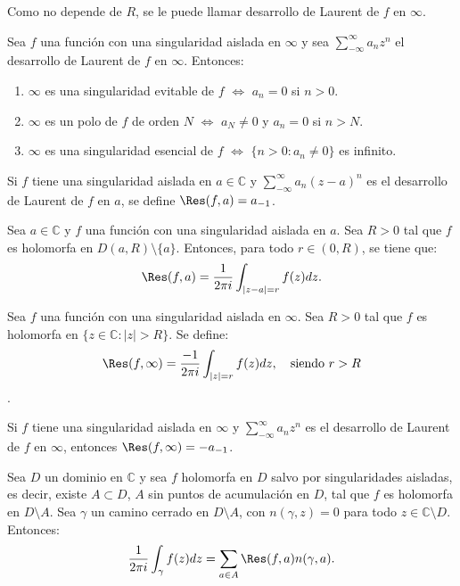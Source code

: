 Como no depende de $R$, se le puede llamar desarrollo de Laurent de $f$ en $\infty$.

\begin{proposition}
    Sea $f$ una función con una singularidad aislada en $\infty$ y sea $\sum_{-\infty}^\infty a_nz^n$ el desarrollo de Laurent de $f$ en $\infty$.
    Entonces:
    \begin{enumerate}
        \item $\infty$ es una singularidad evitable de $f$ $\Leftrightarrow$ $a_n = 0$ si $n > 0$.
        \item $\infty$ es un polo de $f$ de orden $N$ $\Leftrightarrow$ $a_N \neq 0$ y $a_n = 0$ si $n > N$.
        \item $\infty$ es una singularidad esencial de $f$ $\Leftrightarrow$ $\{n > 0 : a_n \neq 0\}$ es infinito.
    \end{enumerate}
\end{proposition}

\begin{definition}
    Si $f$ tiene una singularidad aislada en $a \in \mathbb{C}$ y $\sum_{-\infty}^\infty a_n(z-a)^n$ es el desarrollo de Laurent de $f$ en $a$, se define $\Res(f, a) = a_{-1}$.
\end{definition}

\begin{proposition}
    Sea $a \in \mathbb{C}$ y $f$ una función con una singularidad aislada en $a$.
    Sea $R > 0$ tal que $f$ es holomorfa en $D(a, R) \setminus \{a\}$.
    Entonces, para todo $r \in (0, R)$, se tiene que:
    $$\Res(f, a) = \frac{1}{2\pi i} \int_{|z-a| = r} f(z)dz.$$
\end{proposition}

\begin{proposition}
    Sea $f$ una función con una singularidad aislada en $\infty$.
    Sea $R > 0$ tal que $f$ es holomorfa en $\{z \in \mathbb{C} : |z| > R\}$.
    Se define:
    $$\Res(f, \infty) = \frac{-1}{2\pi i} \int_{|z| = r} f(z)dz, \quad \text{siendo } r > R$$.
\end{proposition}

\begin{proposition}
    Si $f$ tiene una singularidad aislada en $\infty$ y $\sum_{-\infty}^\infty a_nz^n$ es el desarrollo de Laurent de $f$ en $\infty$, entonces $\Res(f, \infty) = -a_{-1}$.
\end{proposition}

\begin{theorem}
    Sea $D$ un dominio en $\mathbb{C}$ y sea $f$ holomorfa en $D$ salvo por singularidades aisladas, es decir, existe $A \subset D$, $A$ sin puntos de acumulación en $D$, tal que $f$ es holomorfa en $D \setminus A$.
    Sea $\gamma$ un camino cerrado en $D \setminus A$, con $n(\gamma, z) = 0$ para todo $z \in \mathbb{C} \setminus D$.
    Entonces:
    $$\frac{1}{2\pi i} \int_\gamma f(z)dz = \sum_{a \in A} \Res(f, a)n(\gamma, a).$$
\end{theorem}

